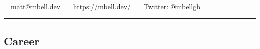\documentclass[11pt,a4paper]{article}
\begin{document}
\begin{center}
{\Huge {}}\\


\ \ matt@mbell.dev \textbullet\
\ \ https://mbell.dev/ \textbullet\
\ \ Twitter: @mbellgb
\end{center}


\hrule
\vspace{-1.2em}
\subsection*{Career}
\end{document}
